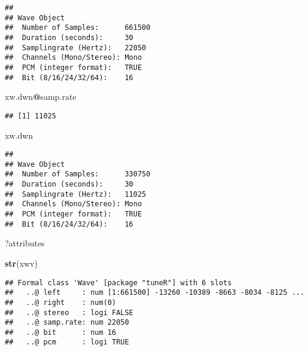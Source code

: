 \documentclass[]{article}
\newenvironment{Shaded}{\begin{snugshade}}{\end{snugshade}}
\newcommand{\KeywordTok}[1]{\textcolor[rgb]{0.13,0.29,0.53}{\textbf{#1}}}
\newcommand{\DataTypeTok}[1]{\textcolor[rgb]{0.13,0.29,0.53}{#1}}
\newcommand{\DecValTok}[1]{\textcolor[rgb]{0.00,0.00,0.81}{#1}}
\newcommand{\StringTok}[1]{\textcolor[rgb]{0.31,0.60,0.02}{#1}}
\newcommand{\CommentTok}[1]{\textcolor[rgb]{0.56,0.35,0.01}{\textit{#1}}}
\newcommand{\OperatorTok}[1]{\textcolor[rgb]{0.81,0.36,0.00}{\textbf{#1}}}
\newcommand{\NormalTok}[1]{#1}
\begin{document}
\begin{verbatim}
## 
## Wave Object
##  Number of Samples:      661500
##  Duration (seconds):     30
##  Samplingrate (Hertz):   22050
##  Channels (Mono/Stereo): Mono
##  PCM (integer format):   TRUE
##  Bit (8/16/24/32/64):    16
\end{verbatim}

\begin{Shaded}
\begin{Highlighting}[]
\NormalTok{xw.dwn}\OperatorTok{@}\NormalTok{samp.rate}
\end{Highlighting}
\end{Shaded}

\begin{verbatim}
## [1] 11025
\end{verbatim}

\begin{Shaded}
\begin{Highlighting}[]
\NormalTok{xw.dwn}
\end{Highlighting}
\end{Shaded}

\begin{verbatim}
## 
## Wave Object
##  Number of Samples:      330750
##  Duration (seconds):     30
##  Samplingrate (Hertz):   11025
##  Channels (Mono/Stereo): Mono
##  PCM (integer format):   TRUE
##  Bit (8/16/24/32/64):    16
\end{verbatim}

\begin{Shaded}
\begin{Highlighting}[]
\NormalTok{?attributes}

\KeywordTok{str}\NormalTok{(xwv)}
\end{Highlighting}
\end{Shaded}

\begin{verbatim}
## Formal class 'Wave' [package "tuneR"] with 6 slots
##   ..@ left     : num [1:661500] -13260 -10389 -8663 -8034 -8125 ...
##   ..@ right    : num(0) 
##   ..@ stereo   : logi FALSE
##   ..@ samp.rate: num 22050
##   ..@ bit      : num 16
##   ..@ pcm      : logi TRUE
\end{verbatim}

\begin{Shaded}
\end{Shaded}
\end{document}
